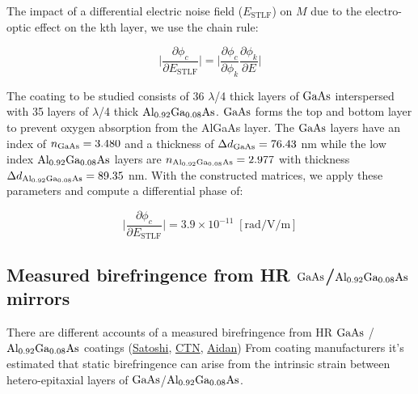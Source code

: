 \noindent The impact of a differential electric noise field ($E_\mathrm{STLF}$) on $M$ due to the electro-optic effect on the kth layer, we use the chain rule:

\begin{equation}
	\bigg| \frac{\partial \phi_c}{\partial  E_\mathrm{STLF}} \bigg| =  \bigg| \frac{\partial \phi_c}{\partial \phi_k}  \frac{\partial \phi_k}{\partial E} \bigg|
\end{equation}

The coating to be studied consists of 36 $\lambda$/4  thick layers of $\mathrm{GaAs}$ interspersed with 35 layers of $\lambda$/4 thick $\mathrm{Al_{0.92}Ga_{0.08}As}$. $\mathrm{GaAs}$ forms the top and bottom layer to prevent oxygen absorption from the AlGaAs layer. The $\mathrm{GaAs}$ layers have an index of $n_{\mathrm{GaAs}} = 3.480$ and a thickness of $\Delta d_{\mathrm{GaAs}} = 76.43$ nm while the low index $\mathrm{Al_{0.92}Ga_{0.08}As}$ layers are $n_{\mathrm{Al_{0.92}Ga_{0.08}As}} = 2.977$ with thickness $\Delta d_{\mathrm{Al_{0.92}Ga_{0.08}As}} = 89.35$ nm. With the constructed matrices, we apply these parameters and compute a differential phase of:

\begin{equation}
	\bigg| \frac{\partial \phi_c}{\partial  E_\mathrm{STLF}} \bigg|  = 3.9 \times 10^{-11}\; [\mathrm{rad}/\mathrm{V}/\mathrm{m}]      
\end{equation}


\subsection{Measured birefringence from HR $\mathrm{GaAs}$/$\mathrm{Al_{0.92}Ga_{0.08}As}$ mirrors}

There are different accounts of a measured birefringence from HR $\mathrm{GaAs}$ / $\mathrm{Al_{0.92}Ga_{0.08}As}$ coatings (\href{https://dcc.ligo.org/DocDB/0181/G2200386/001/G2200386.pdf}{Satoshi}, \href{https://nodus.ligo.caltech.edu:8081/CTN/1474}{CTN}, \href{https://dcc.ligo.org/DocDB/0181/G2200559/001/G2200559-v1%20-%20polarization.pdf}{Aidan})
From coating manufacturers it's estimated that static birefringence can arise from the intrinsic strain between hetero-epitaxial layers of $\mathrm{GaAs}$/$\mathrm{Al_{0.92}Ga_{0.08}As}$. \cite{Cole:2013, adachi:algaas}

